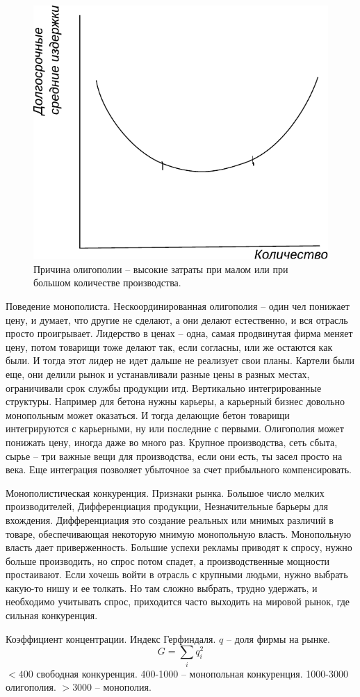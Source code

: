 \documentclass[a4paper, 12pt]{article}
\begin{document}
\begin{figure}
\includegraphics[width=.5\linewidth]{figures/oligopoly}
\caption{Причина олигополии -- высокие затраты при малом или при большом количестве производства.}
\label{fig:oligopoly}
\end{figure}

Поведение монополиста. Нескоординированная олигополия -- один чел понижает цену, и думает, что другие не сделают, а они делают естественно, и вся отрасль просто проигрывает. Лидерство в ценах -- одна, самая продвинутая фирма меняет цену, потом товарищи тоже делают так, если согласны, или же остаются как были. И тогда этот лидер не идет дальше не реализует свои планы. Картели были еще, они делили рынок и устанавливали разные цены в разных местах, ограничивали срок службы продукции итд. Вертикально интегрированные структуры. Например для бетона нужны карьеры, а карьерный бизнес довольно монопольным может оказаться. И тогда делающие бетон товарищи интегрируются с карьерными, ну или последние с первыми. Олигополия может понижать цену, иногда даже во много раз. Крупное производства, сеть сбыта, сырье -- три важные вещи для производства, если они есть, ты засел просто на века. Еще интеграция позволяет убыточное за счет прибыльного компенсировать. 

Монополистическая конкуренция. Признаки рынка. Большое число мелких производителей, Дифференциация продукции, Незначительные барьеры для вхождения. Дифференциация это создание реальных или мнимых различий в товаре, обеспечивающая некоторую мнимую монопольную власть. Монопольную власть дает приверженность. Большие успехи рекламы приводят к спросу, нужно больше производить, но спрос потом спадет, а производственные мощности простаивают. Если хочешь войти в отрасль с крупными людьми, нужно выбрать какую-то нишу и ее толкать. Но там сложно выбрать, трудно удержать, и необходимо учитывать спрос, приходится часто выходить на мировой рынок, где сильная конкуренция. 

Коэффициент концентрации. Индекс Герфиндаля. $q$ -- доля фирмы на рынке. 
$$
G = \sum_i q_i^2  
$$
$<400$ свободная конкуренция. 400-1000 -- монопольная конкуренция. 1000-3000 олигополия. $>3000$ -- монополия. 
\end{document}
